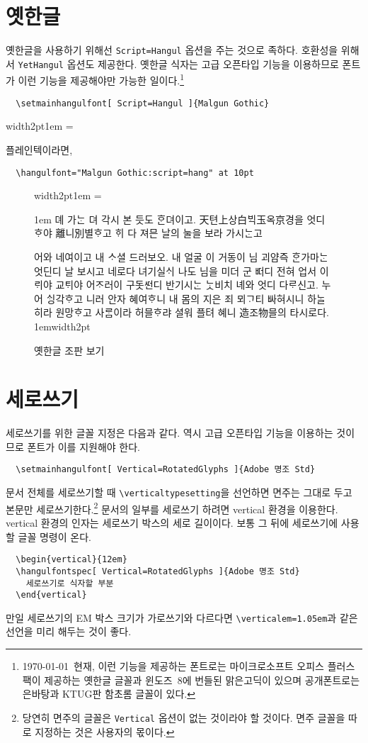 \documentclass[a4paper]{article}
\newenvironment{plaintex}
  {\par\medskip\leavevmode\hbox\bgroup
    \color{white!80!black}\vrule width2pt\color{black}\kern1em
    \vbox\bgroup\hsize=\dimexpr\textwidth-12pt\relax
    \small
  }{\egroup\egroup\par\medskip}
\newenvironment{example}
  {\leavevmode\hbox\bgroup
    \color{white!80!black}\vrule width2pt\color{black}\kern1em
    \vbox\bgroup\hsize=\dimexpr\textwidth-24pt\relax
  }{\egroup\kern1em\color{white!80!black}\vrule width2pt\color{black}\egroup}
\def\cs#1{\texttt{\color{red!70!black}\textbackslash #1}}
\begin{document}
\section{옛한글}
옛한글을 사용하기 위해선 \verb|Script=Hangul| 옵션을 주는 것으로 족하다.
호환성을 위해서 \verb|YetHangul| 옵션도 제공한다.
옛한글 식자는 고급 오픈타입 기능을 이용하므로
폰트가 이런 기능을 제공해야만 가능한 일이다.\footnote{%
\today\ 현재, 이런 기능을 제공하는 폰트로는 마이크로소프트 오피스 플러스팩이
제공하는 옛한글 글꼴과 윈도즈~8에 번들된 맑은고딕이 있으며
공개폰트로는 은바탕과 KTUG판 함초롬 글꼴이 있다.}
\begin{verbatim}
  \setmainhangulfont[ Script=Hangul ]{Malgun Gothic}
\end{verbatim}
\begin{plaintex}
플레인텍이라면,
\begin{verbatim}
  \hangulfont="Malgun Gothic:script=hang" at 10pt
\end{verbatim}
\end{plaintex}

\begin{figure}
  \begin{example}
    \hanjabyhangulfont\parindent1em
뎨 가ᄂᆞᆫ 뎌 각시 본 듯도 ᄒᆞᆫ뎌이고.
天텬上상白ᄇᆡᆨ玉옥京경을 엇디ᄒᆞ야 離니別별ᄒᆞ고
ᄒᆡ 다 져믄 날의 눌을 보라 가시ᄂᆞᆫ고

어와 네여이고 내 ᄉᆞ셜 드러보오.
내 얼굴 이 거동이 님 괴얌즉 ᄒᆞᆫ가마ᄂᆞᆫ
엇딘디 날 보시고 네로다 녀기실ᄉᆡ
나도 님을 미더 군 ᄠᅥ디 전혀 업서
이ᄅᆡ야 교ᄐᆡ야 어ᄌᆞ러이 구돗ᄯᅥᆫ디
반기시ᄂᆞᆫ ᄂᆞᆺ비치 녜와 엇디 다ᄅᆞ신고.
누어 ᄉᆡᆼ각ᄒᆞ고 니러 안자 혜여ᄒᆞ니
내 몸의 지은 죄 뫼ᄀᆞ티 ᄡᅡ혀시니
하ᄂᆞᆯ히라 원망ᄒᆞ고 사ᄅᆞᆷ이라 허믈ᄒᆞ랴
셜워 플텨 혜니 造조物믈의 타시로다.
  \end{example}
  \caption{옛한글 조판 보기}\label{fig:yethangul}
\end{figure}

\section{세로쓰기}
세로쓰기를 위한 글꼴 지정은 다음과 같다.
역시 고급 오픈타입 기능을 이용하는 것이므로
폰트가 이를 지원해야 한다.
\begin{verbatim}
  \setmainhangulfont[ Vertical=RotatedGlyphs ]{Adobe 명조 Std}
\end{verbatim}
문서 전체를 세로쓰기할 때 \cs{verticaltypesetting}을 선언하면
면주는 그대로 두고 본문만 세로쓰기한다.\footnote{당연히 면주의 글꼴은
\texttt{Vertical} 옵션이 없는 것이라야 할 것이다.
면주 글꼴을 따로 지정하는 것은 사용자의 몫이다. }
문서의 일부를 세로쓰기 하려면 vertical 환경을 이용한다.
vertical 환경의 인자는 세로쓰기 박스의 세로 길이이다.
보통 그 뒤에  세로쓰기에 사용할 글꼴 명령이 온다.
\begin{verbatim}
  \begin{vertical}{12em}
  \hangulfontspec[ Vertical=RotatedGlyphs ]{Adobe 명조 Std}
    세로쓰기로 식자할 부분
  \end{vertical}
\end{verbatim}
만일 세로쓰기의 EM 박스 크기가 가로쓰기와 다르다면
\cs{verticalem=1.05em}과 같은 선언을 미리 해두는 것이 좋다.
\end{document}
